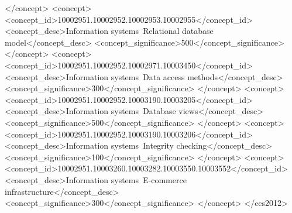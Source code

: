 \documentclass[sigconf]{acmart}
\begin{document}
\begin{CCSXML}
       </concept>
   <concept>
       <concept_id>10002951.10002952.10002953.10002955</concept_id>
       <concept_desc>Information systems~Relational database model</concept_desc>
       <concept_significance>500</concept_significance>
       </concept>
   <concept>
       <concept_id>10002951.10002952.10002971.10003450</concept_id>
       <concept_desc>Information systems~Data access methods</concept_desc>
       <concept_significance>300</concept_significance>
       </concept>
   <concept>
       <concept_id>10002951.10002952.10003190.10003205</concept_id>
       <concept_desc>Information systems~Database views</concept_desc>
       <concept_significance>500</concept_significance>
       </concept>
   <concept>
       <concept_id>10002951.10002952.10003190.10003206</concept_id>
       <concept_desc>Information systems~Integrity checking</concept_desc>
       <concept_significance>100</concept_significance>
       </concept>
   <concept>
       <concept_id>10002951.10003260.10003282.10003550.10003552</concept_id>
       <concept_desc>Information systems~E-commerce infrastructure</concept_desc>
       <concept_significance>300</concept_significance>
       </concept>
 </ccs2012>
\end{CCSXML}


\end{document}
